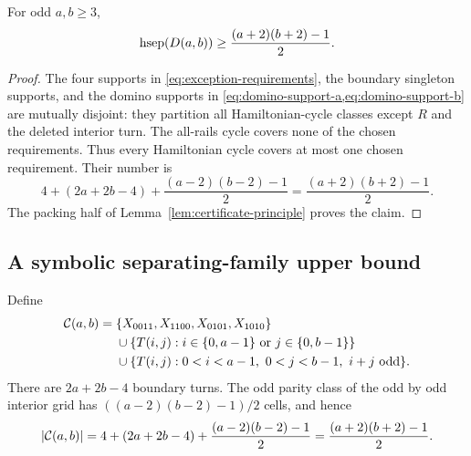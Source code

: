 \begin{theorem}
\label{thm:packing-lift}
For odd \(a,b\ge3\),
\[
 \operatorname{hsep}(D(a,b))\ge \frac{(a+2)(b+2)-1}{2}.
\]
\end{theorem}

\begin{proof}
The four supports in \cref{eq:exception-requirements}, the boundary singleton
supports, and the domino supports in
\cref{eq:domino-support-a,eq:domino-support-b} are mutually disjoint: they
partition all Hamiltonian-cycle classes except \(R\) and the deleted interior
turn.  The all-rails cycle covers none of the chosen requirements.  Thus every
Hamiltonian cycle covers at most one chosen requirement.  Their number is
\[
 4+(2a+2b-4)+\frac{(a-2)(b-2)-1}{2}
 =\frac{(a+2)(b+2)-1}{2}.
\]
The packing half of Lemma~\ref{lem:certificate-principle} proves the claim.
\end{proof}

\subsection{A symbolic separating-family upper bound}

Define
\begin{align}
\label{eq:symbolic-family}
 \mathcal{C}(a,b)={}&\{X_{0011},X_{1100},X_{0101},X_{1010}\}\notag\\
 &\cup\{T(i,j):i\in\{0,a-1\}\text{ or }j\in\{0,b-1\}\}\notag\\
 &\cup\{T(i,j):0<i<a-1,\ 0<j<b-1,\ i+j\text{ odd}\}.
\end{align}
There are \(2a+2b-4\) boundary turns.  The odd parity class of the odd by
odd interior grid has \(((a-2)(b-2)-1)/2\) cells, and hence
\begin{equation}
\label{eq:symbolic-family-size}
 |\mathcal{C}(a,b)|=4+(2a+2b-4)+\frac{(a-2)(b-2)-1}{2}
 =\frac{(a+2)(b+2)-1}{2}.
\end{equation}

